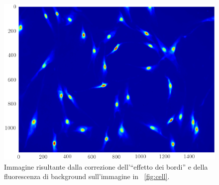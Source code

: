 \begin{figure}
 \centering
 \includegraphics[scale=.64]{img/CAP3cellcorr.png}
 \caption{\small{Immagine risultante dalla correzione dell'``effetto dei bordi'' e della fluorescenza di background sull'immagine in \figurename~\ref{fig:cell}.}}
 \label{fig:cellcorr}
\end{figure}